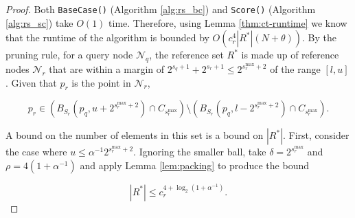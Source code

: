 \begin{proof}
Both \texttt{BaseCase()} (Algorithm \ref{alg:rs_bc}) and \texttt{Score()}
(Algorithm \ref{alg:rs_sc}) take $O(1)$ time.  Therefore, using Lemma
\ref{thm:ct-runtime} we know that the runtime of the algorithm is bounded by
$O(c_r^4 |R^*| (N + \theta))$. %
By the pruning rule, for a query node
$\mathscr{N}_q$, the reference set $R^*$
is made up of reference nodes $\mathscr{N}_r$ that are within a margin of
$2^{s_q + 1} + 2^{s_r + 1} \le 2^{s_r^{\max} + 2}$ of the range $[l, u]$.  Given
that $p_r$ is the point in $\mathscr{N}_r$,

\begin{equation}
p_r \in \left( B_{S_r}(p_q, u + 2^{s_r^{\max} + 2}) \cap
C_{s_r^{\max}}\right)\setminus \left( B_{S_r}(p_q, l - 2^{s_r^{\max} + 2}) \cap
C_{s_r^{\max}} \right). \label{eqn:rsballs}
\end{equation}

A bound on the number of elements in this set is a bound on $|R^*|$.  %
First, consider the case where $u \le \alpha^{-1} 2^{s_r^{\max} + 2}$.  Ignoring
the smaller ball, take $\delta = 2^{s_r^{\max}}$ and $\rho = 4 (1 +
\alpha^{-1})$ and apply Lemma \ref{lem:packing} to produce the bound

\begin{equation}
|R^*| \le c_r^{4 + \log_2(1 + \alpha^{-1})}.
\end{equation}




\end{proof}
